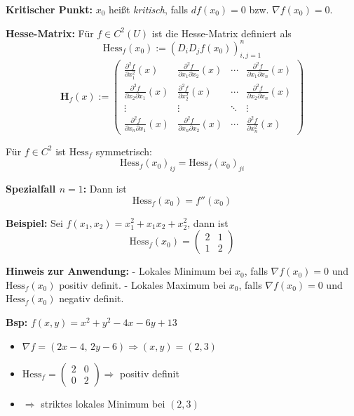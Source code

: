 \textbf{Kritischer Punkt:} $x_0$ heißt \textit{kritisch}, falls $df(x_0) = 0$ bzw. $\nabla f(x_0) = 0$.

\textbf{Hesse-Matrix:} Für $f \in C^2(U)$ ist die Hesse-Matrix definiert als
\[
\text{Hess}_f(x_0) := \left(D_i D_j f(x_0)\right)_{i,j=1}^n
\]
{\small
\[
\mathbf{H}_f(x) :=
\begin{pmatrix}
\frac{\partial^2 f}{\partial x_1^2}(x) & \frac{\partial^2 f}{\partial x_1 \partial x_2}(x) & \cdots & \frac{\partial^2 f}{\partial x_1 \partial x_n}(x) \\
\frac{\partial^2 f}{\partial x_2 \partial x_1}(x) & \frac{\partial^2 f}{\partial x_2^2}(x) & \cdots & \frac{\partial^2 f}{\partial x_2 \partial x_n}(x) \\
\vdots & \vdots & \ddots & \vdots \\
\frac{\partial^2 f}{\partial x_n \partial x_1}(x) & \frac{\partial^2 f}{\partial x_n \partial x_2}(x) & \cdots & \frac{\partial^2 f}{\partial x_n^2}(x)
\end{pmatrix}
\]
}


Für $f \in C^2$ ist $\text{Hess}_f$ symmetrisch:
\[
\text{Hess}_f(x_0)_{ij} = \text{Hess}_f(x_0)_{ji}
\]

\textbf{Spezialfall $n = 1$:} Dann ist
\[
\text{Hess}_f(x_0) = f''(x_0)
\]

\textbf{Beispiel:} Sei $f(x_1, x_2) = x_1^2 + x_1 x_2 + x_2^2$, dann ist
\[
\text{Hess}_f(x_0) = 
\begin{pmatrix}
2 & 1 \\
1 & 2
\end{pmatrix}
\]

\textbf{Hinweis zur Anwendung:}
- Lokales Minimum bei $x_0$, falls $\nabla f(x_0) = 0$ und $\text{Hess}_f(x_0)$ positiv definit.
- Lokales Maximum bei $x_0$, falls $\nabla f(x_0) = 0$ und $\text{Hess}_f(x_0)$ negativ definit.

\textbf{Bsp:} \( f(x, y) = x^2 + y^2 - 4x - 6y + 13 \)

\begin{itemize}
  \item \( \nabla f = (2x - 4,\, 2y - 6) \Rightarrow (x, y) = (2, 3) \)
  \item \( \text{Hess}_f =
  \begin{pmatrix}
  2 & 0 \\
  0 & 2
  \end{pmatrix} \Rightarrow \) positiv definit
  \item \( \Rightarrow \) striktes lokales Minimum bei \( (2, 3) \)
\end{itemize}

